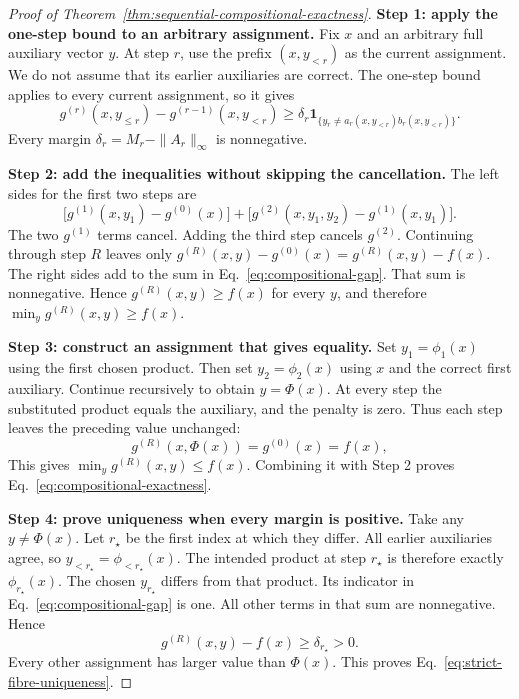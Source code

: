 \documentclass[a4paper,onecolumn,11pt,unpublished]{quantumarticle}
\theoremstyle{remark}
\begin{document}
\begin{proof}[Proof of Theorem~\ref{thm:sequential-compositional-exactness}]
\textbf{Step 1: apply the one-step bound to an arbitrary assignment.}
Fix $x$ and an arbitrary full auxiliary vector $y$.
At step $r$, use the prefix $(x,y_{<r})$ as the current assignment.
We do not assume that its earlier auxiliaries are correct.
The one-step bound applies to every current assignment, so it gives
\begin{equation}
  g^{(r)}(x,y_{\leq r})-g^{(r-1)}(x,y_{<r})
  \geq\delta_r
  \mathbf 1_{\{y_r\neq
  a_r(x,y_{<r})b_r(x,y_{<r})\}}.
  \label{eq:stepwise-compositional-gap}
\end{equation}
Every margin $\delta_r=M_r-\|A_r\|_\infty$ is nonnegative.

\textbf{Step 2: add the inequalities without skipping the cancellation.}
The left sides for the first two steps are
\[
\bigl[g^{(1)}(x,y_1)-g^{(0)}(x)\bigr]
+\bigl[g^{(2)}(x,y_1,y_2)-g^{(1)}(x,y_1)\bigr].
\]
The two $g^{(1)}$ terms cancel. Adding the third step cancels $g^{(2)}$.
Continuing through step $R$ leaves only
$g^{(R)}(x,y)-g^{(0)}(x)=g^{(R)}(x,y)-f(x)$.
The right sides add to the sum in Eq.~\eqref{eq:compositional-gap}.
That sum is nonnegative. Hence $g^{(R)}(x,y)\geq f(x)$ for every $y$,
and therefore $\min_y g^{(R)}(x,y)\geq f(x)$.

\textbf{Step 3: construct an assignment that gives equality.}
Set $y_1=\phi_1(x)$ using the first chosen product.
Then set $y_2=\phi_2(x)$ using $x$ and the correct first auxiliary.
Continue recursively to obtain $y=\Phi(x)$.
At every step the substituted product equals the auxiliary, and the penalty
is zero. Thus each step leaves the preceding value unchanged:
\begin{equation}
  g^{(R)}(x,\Phi(x))=g^{(0)}(x)=f(x),
\end{equation}
This gives $\min_y g^{(R)}(x,y)\leq f(x)$.
Combining it with Step 2 proves Eq.~\eqref{eq:compositional-exactness}.

\textbf{Step 4: prove uniqueness when every margin is positive.}
Take any $y\neq\Phi(x)$.
Let $r_\star$ be the first index at which they differ.
All earlier auxiliaries agree, so
$y_{<r_\star}=\phi_{<r_\star}(x)$.
The intended product at step $r_\star$ is therefore exactly
$\phi_{r_\star}(x)$. The chosen $y_{r_\star}$ differs from that product.
Its indicator in Eq.~\eqref{eq:compositional-gap} is one.
All other terms in that sum are nonnegative. Hence
\[
g^{(R)}(x,y)-f(x)\geq\delta_{r_\star}>0.
\]
Every other assignment has larger value than $\Phi(x)$.
This proves Eq.~\eqref{eq:strict-fibre-uniqueness}.
\end{proof}
\end{document}

